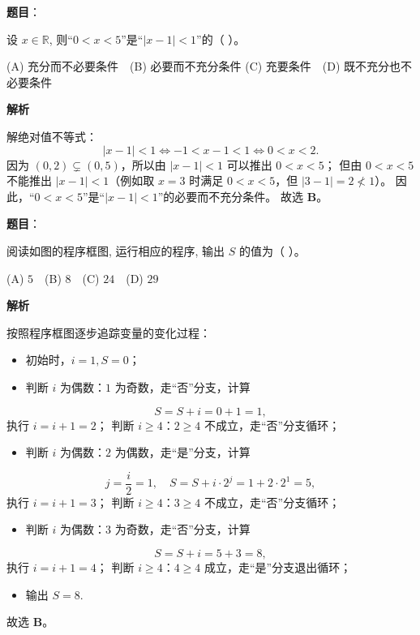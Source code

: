\begin{answer}

\textbf{题目}：

设 $x \in \mathbb{R}$, 则“$0 < x < 5$”是“$|x - 1| < 1$”的（ ）。

(A) 充分而不必要条件　(B) 必要而不充分条件  
(C) 充要条件　(D) 既不充分也不必要条件

\textbf{解析}

解绝对值不等式：
\nopagebreak[4]
\[|x - 1| < 1 \iff -1 < x - 1 < 1 \iff 0 < x < 2.\]
因为 $(0, 2) \subsetneq (0, 5)$，所以由 $|x - 1| < 1$ 可以推出 $0 < x < 5$；
但由 $0 < x < 5$ 不能推出 $|x - 1| < 1$（例如取 $x = 3$ 时满足 $0 < x < 5$，但 $|3 - 1| = 2 \not< 1$）。
因此，“$0 < x < 5$”是“$|x - 1| < 1$”的必要而不充分条件。
故选 \textbf{B}。


\end{answer}
\begin{answer}

\textbf{题目}：

阅读如图的程序框图, 运行相应的程序, 输出 $S$ 的值为（ ）。
\nopagebreak[4]
\begin{center}\end{center}
\nopagebreak[4]
(A) $5$　(B) $8$　(C) $24$　(D) $29$

\textbf{解析}

按照程序框图逐步追踪变量的变化过程：
\begin{itemize}
\item 初始时，$i = 1, S = 0$；
\item 判断 $i$ 为偶数：$1$ 为奇数，走“否”分支，计算
\end{itemize}
\nopagebreak[4]
\[S = S + i = 0 + 1 = 1,\]
  执行 $i = i + 1 = 2$；
  判断 $i \geqslant 4$：$2 \geqslant 4$ 不成立，走“否”分支循环；
\begin{itemize}
\item 判断 $i$ 为偶数：$2$ 为偶数，走“是”分支，计算
\end{itemize}
\nopagebreak[4]
\[j = \frac{i}{2} = 1,\quad S = S + i \cdot 2^j = 1 + 2 \cdot 2^1 = 5,\]
  执行 $i = i + 1 = 3$；
  判断 $i \geqslant 4$：$3 \geqslant 4$ 不成立，走“否”分支循环；
\begin{itemize}
\item 判断 $i$ 为偶数：$3$ 为奇数，走“否”分支，计算
\end{itemize}
\nopagebreak[4]
\[S = S + i = 5 + 3 = 8,\]
  执行 $i = i + 1 = 4$；
  判断 $i \geqslant 4$：$4 \geqslant 4$ 成立，走“是”分支退出循环；
\begin{itemize}
\item 输出 $S = 8$.
\end{itemize}
故选 \textbf{B}。


\end{answer}
